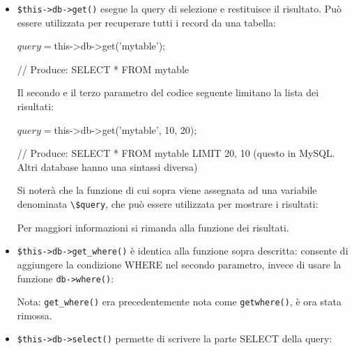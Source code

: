 \begin{itemize}

\item \verb|$this->db->get()| esegue la query di selezione e restituisce il risultato. Può essere utilizzata per recuperare tutti i record da una tabella:

\begin{code}
$query = $this->db->get('mytable');

// Produce: SELECT * FROM mytable
\end{code}

Il secondo e il terzo parametro del codice seguente limitano la lista dei risultati:

\begin{code}
$query = $this->db->get('mytable', 10, 20);

// Produce: SELECT * FROM mytable LIMIT 20, 10 (questo in MySQL. Altri database hanno una sintassi diversa)
\end{code}

Si noterà che la funzione di cui sopra viene assegnata ad una variabile denominata \verb|\$query|, che può essere utilizzata per mostrare i risultati:


Per maggiori informazioni si rimanda alla funzione dei risultati.

\item \verb|$this->db->get_where()| è identica alla funzione sopra descritta: consente di aggiungere la condizione WHERE nel secondo parametro, invece di usare la funzione \verb|db->where()|:


Nota: \verb|get_where()| era precedentemente nota come \verb|getwhere()|, è ora stata rimossa.

\item \verb|$this->db->select()| permette di scrivere la parte SELECT della query:

\end{itemize}
